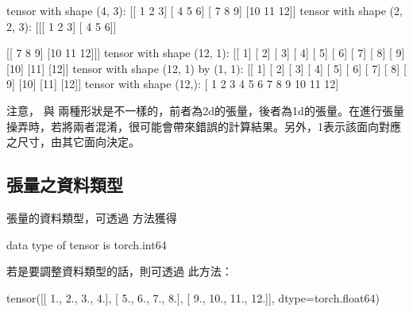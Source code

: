 \documentclass[letterpaper,10pt,english]{sphinxmanual}
\begin{document}
\begin{sphinxVerbatim}[commandchars=\\\{\}]
tensor with shape (4, 3): 
 [[ 1  2  3]
 [ 4  5  6]
 [ 7  8  9]
 [10 11 12]]
tensor with shape (2, 2, 3): 
 [[[ 1  2  3]
  [ 4  5  6]]

 [[ 7  8  9]
  [10 11 12]]]
tensor with shape (12, 1): 
 [[ 1]
 [ 2]
 [ 3]
 [ 4]
 [ 5]
 [ 6]
 [ 7]
 [ 8]
 [ 9]
 [10]
 [11]
 [12]]
tensor with shape (12, 1) by (\PYGZhy{}1, 1): 
 [[ 1]
 [ 2]
 [ 3]
 [ 4]
 [ 5]
 [ 6]
 [ 7]
 [ 8]
 [ 9]
 [10]
 [11]
 [12]]
tensor with shape (12,): 
 [ 1  2  3  4  5  6  7  8  9 10 11 12]
\end{sphinxVerbatim}

注意， 與  兩種形狀是不一樣的，前者為2d的張量，後者為1d的張量。在進行張量操弄時，若將兩者混淆，很可能會帶來錯誤的計算結果。另外，\sphinxhyphen{}1表示該面向對應之尺寸，由其它面向決定。


\subsection{張量之資料類型}
\label{\detokenize{notebook/lab-torch-tensor:id5}}
張量的資料類型，可透過  方法獲得

\begin{sphinxVerbatim}[commandchars=\\\{\}]
 
\end{sphinxVerbatim}

\begin{sphinxVerbatim}[commandchars=\\\{\}]
data type of tensor is torch.int64
\end{sphinxVerbatim}

若是要調整資料類型的話，則可透過  此方法：

\begin{sphinxVerbatim}[commandchars=\\\{\}]
\end{sphinxVerbatim}

\begin{sphinxVerbatim}[commandchars=\\\{\}]
tensor([[ 1.,  2.,  3.,  4.],
        [ 5.,  6.,  7.,  8.],
        [ 9., 10., 11., 12.]], dtype=torch.float64)
\end{sphinxVerbatim}
\end{document}
